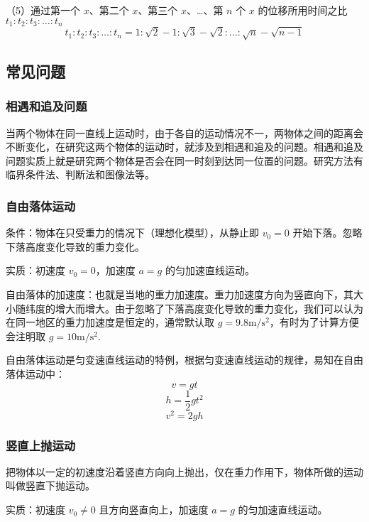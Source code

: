 （5）通过第一个 $x$、第二个 $x$、第三个 $x$、…、第 $n$ 个 $x$ 的位移所用时间之比 $t_1:t_2:t_3:\dots:t_n$
\begin{equation}
t_1:t_2:t_3:\dots:t_n=1:\sqrt{2}-1:\sqrt{3}-\sqrt{2}:\dots:\sqrt{n}-\sqrt{n-1}
\end{equation}

\subsection{常见问题}
\subsubsection{相遇和追及问题}
当两个物体在同一直线上运动时，由于各自的运动情况不一，两物体之间的距离会不断变化，在研究这两个物体的运动时，就涉及到相遇和追及的问题。相遇和追及问题实质上就是研究两个物体是否会在同一时刻到达同一位置的问题。研究方法有临界条件法、判断法和图像法等。

\subsubsection{自由落体运动}
条件：物体在只受重力的情况下（理想化模型），从静止即 $v_0=0$ 开始下落。忽略下落高度变化导致的重力变化。

实质：初速度 $v_0=0$，加速度 $a=g$ 的匀加速直线运动。

自由落体的加速度：也就是当地的重力加速度。重力加速度方向为竖直向下，其大小随纬度的增大而增大。由于忽略了下落高度变化导致的重力变化，我们可以认为在同一地区的重力加速度是恒定的，通常默认取 $g=9.8\mathrm{m/s^2}$，有时为了计算方便会注明取 $g=10\mathrm{m/s^2}$.

自由落体运动是匀变速直线运动的特例，根据匀变速直线运动的规律，易知在自由落体运动中：
\begin{equation}
v=gt
\end{equation}
\begin{equation}
h=\frac12gt^2
\end{equation}
\begin{equation}
v^2=2gh
\end{equation}

\subsubsection{竖直上抛运动}
把物体以一定的初速度沿着竖直方向向上抛出，仅在重力作用下，物体所做的运动叫做竖直下抛运动。

实质：初速度 $v_0\neq0$ 且方向竖直向上，加速度 $a=g$ 的匀加速直线运动。

